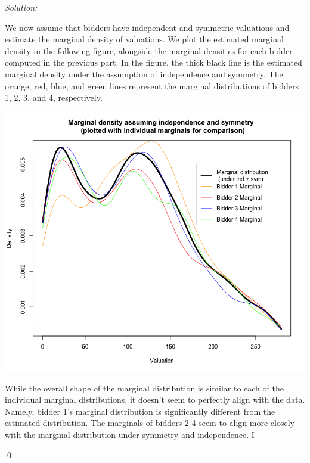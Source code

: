 \documentclass[12pt]{article}
\newenvironment{problem}[2][Problem]{\begin{trivlist}
\item[\hskip \labelsep {\bfseries #1}\hskip \labelsep {\bfseries #2.}]}{\end{trivlist}}
\newenvironment{sol}
    {\emph{Solution:}
    }
    {
    \qed
    }
\begin{document}
\begin{problem}{5}
\end{problem}
\begin{sol}
    We now assume that bidders have independent and symmetric valuations and estimate the marginal density of valuations. We plot the estimated marginal density in the following figure, alongside the marginal densities for each bidder computed in the previous part. In the figure, the thick black line is the estimated marginal density under the assumption of independence and symmetry. The orange, red, blue, and green lines represent the marginal distributions of bidders 1, 2, 3, and 4, respectively.
    \begin{center}
    \includegraphics[scale=0.45]{Marginal_plot.png}
    \end{center}
    While the overall shape of the marginal distribution is similar to each of the individual marginal distributions, it doesn't seem to perfectly align with the data. Namely, bidder 1's marginal distribution is significantly different from the estimated distribution. The marginals of bidders 2-4 seem to align more closely with the marginal distribution under symmetry and independence. I


\end{sol}
\end{document}
